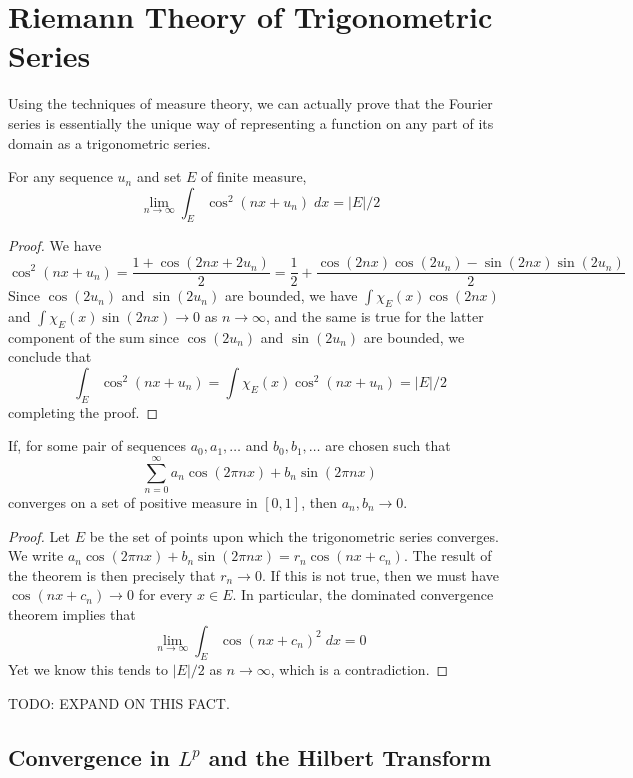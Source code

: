 \chapter{Riemann Theory of Trigonometric Series}

Using the techniques of measure theory, we can actually prove that the Fourier series is essentially the unique way of representing a function on any part of its domain as a trigonometric series.

\begin{lemma}
  For any sequence $u_n$ and set $E$ of finite measure,
  \[ \lim_{n \to \infty} \int_E \cos^2(nx + u_n)\; dx = |E|/2 \]
\end{lemma}
\begin{proof}
  We have
  \[ \cos^2(nx + u_n) = \frac{1 + \cos(2nx + 2u_n)}{2} = \frac{1}{2} + \frac{\cos(2nx) \cos(2u_n) - \sin(2nx) \sin(2u_n)}{2} \]
  Since $\cos(2u_n)$ and $\sin(2u_n)$ are bounded, we have $\int \chi_E(x) \cos(2nx)$ and $\int \chi_E(x) \sin(2nx) \to 0$ as $n \to \infty$, and the same is true for the latter component of the sum since $\cos(2u_n)$ and $\sin(2u_n)$ are bounded, we conclude that
  \[ \int_E \cos^2(nx + u_n) = \int \chi_E(x) \cos^2(nx + u_n) = |E|/2 \]
  completing the proof.
\end{proof}

\begin{theorem}
  If, for some pair of sequences $a_0, a_1, \dots$ and $b_0, b_1, \dots$ are chosen such that
  \[ \sum_{n = 0}^\infty a_n \cos(2 \pi nx) + b_n \sin(2 \pi nx) \]
  converges on a set of positive measure in $[0,1]$, then $a_n, b_n \to 0$.
\end{theorem}
\begin{proof}
  Let $E$ be the set of points upon which the trigonometric series converges. We write $a_n \cos(2 \pi n x) + b_n \sin(2 \pi n x) = r_n \cos(nx + c_n)$. The result of the theorem is then precisely that $r_n \to 0$. If this is not true, then we must have $\cos(nx + c_n) \to 0$ for every $x \in E$. In particular, the dominated convergence theorem implies that
  \[ \lim_{n \to \infty} \int_E \cos(nx + c_n)^2\; dx = 0 \]
  Yet we know this tends to $|E|/2$ as $n \to \infty$, which is a contradiction.
\end{proof}

TODO: EXPAND ON THIS FACT.






\section{Convergence in $L^p$ and the Hilbert Transform}

